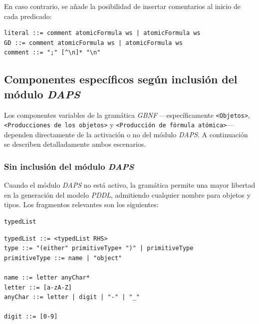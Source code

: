 En caso contrario, se añade la posibilidad de insertar comentarios al inicio de cada predicado:

\begin{tcolorbox}[colback=blue!5!white, colframe=blue!75!black, title=Producciones con módulo \textit{Comments}, fonttitle=\bfseries, breakable]
\small
\begin{verbatim}
literal ::= comment atomicFormula ws | atomicFormula ws
GD ::= comment atomicFormula ws | atomicFormula ws
comment ::= ";" [^\n]* "\n"
\end{verbatim}
\end{tcolorbox}

\subsection{Componentes específicos según inclusión del módulo \textit{DAPS}}

Los componentes variables de la gramática \textit{GBNF} ---específicamente \texttt{<Objetos>}, \texttt{<Producciones de los objetos>} y \texttt{<Producción de fórmula atómica>}--- dependen directamente de la activación o no del módulo \textit{DAPS}. A continuación se describen detalladamente ambos escenarios.

\subsubsection{Sin inclusión del módulo \textit{DAPS}}

Cuando el módulo \textit{DAPS} no está activo, la gramática permite una mayor libertad en la generación del modelo \textit{PDDL}, admitiendo cualquier nombre para objetos y tipos. Los fragmentos relevantes son los siguientes:

\begin{tcolorbox}[colback=blue!5!white, colframe=blue!75!black, title=Fragmento \texttt{<Objetos>} sin \textit{DAPS}, fonttitle=\bfseries, breakable]
\small
\begin{verbatim}
typedList
\end{verbatim}
\end{tcolorbox}

\begin{tcolorbox}[colback=blue!5!white, colframe=blue!75!black, title=Producciones de los objetos sin \textit{DAPS}, fonttitle=\bfseries, breakable]
\small
\begin{verbatim}
typedList ::= <typedList RHS>
type ::= "(either" primitiveType+ ")" | primitiveType
primitiveType ::= name | "object"

name ::= letter anyChar*
letter ::= [a-zA-Z]
anyChar ::= letter | digit | "-" | "_"

digit ::= [0-9]
\end{verbatim}
\end{tcolorbox}

